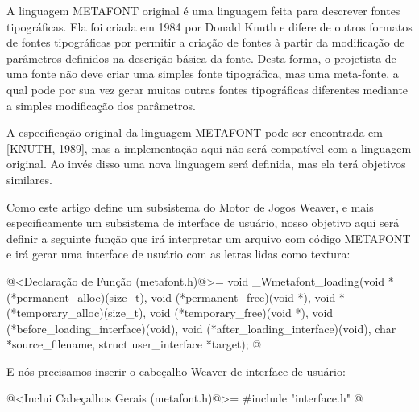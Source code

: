 

A linguagem METAFONT original é uma linguagem feita para descrever
fontes tipográficas. Ela foi criada em 1984 por Donald Knuth e difere
de outros formatos de fontes tipográficas por permitir a criação de
fontes à partir da modificação de parâmetros definidos na descrição
básica da fonte. Desta forma, o projetista de uma fonte não deve criar
uma simples fonte tipográfica, mas uma meta-fonte, a qual pode por sua
vez gerar muitas outras fontes tipográficas diferentes mediante a
simples modificação dos parâmetros.

A especificação original da linguagem METAFONT pode ser encontrada em
[KNUTH, 1989], mas a implementação aqui não será compatível com a
linguagem original. Ao invés disso uma nova linguagem será definida,
mas ela terá objetivos similares.

Como este artigo define um subsistema do Motor de Jogos Weaver, e mais
especificamente um subsistema de interface de usuário, nosso objetivo
aqui será definir a seguinte função que irá interpretar um arquivo com
código METAFONT e irá gerar uma interface de usuário com as letras
lidas como textura:

\iniciocodigo
@<Declaração de Função (metafont.h)@>=
void _Wmetafont_loading(void *(*permanent_alloc)(size_t),
                        void (*permanent_free)(void *),
                        void *(*temporary_alloc)(size_t),
                        void (*temporary_free)(void *),
                        void (*before_loading_interface)(void),
                        void (*after_loading_interface)(void),
                        char *source_filename,
                        struct user_interface *target);
@
\fimcodigo

E nós precisamos inserir o cabeçalho Weaver de interface de usuário:

\iniciocodigo
@<Inclui Cabeçalhos Gerais (metafont.h)@>=
#include "interface.h"
@
\fimcodigo

